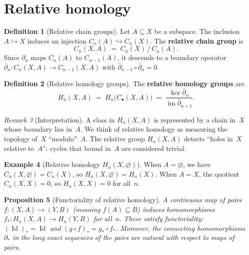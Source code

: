 \documentclass[12pt,a4paper,openany]{book}
\theoremstyle{definition}
\newtheorem{definition}{Definition}[chapter]
\newtheorem{example}[definition]{Example}
\theoremstyle{plain}
\newtheorem{proposition}[definition]{Proposition}
\theoremstyle{remark}
\newtheorem{remark}[definition]{Remark}
\DeclareMathOperator{\im}{im}
\DeclareMathOperator{\Id}{Id}
\begin{document}
\section{Relative homology}\label{sec:relative-homology}

\begin{definition}[Relative chain groups]\label{def:relative-chains}
Let $A\subseteq X$ be a subspace.  The inclusion $A\hookrightarrow X$
induces an injection $C_n(A)\hookrightarrow C_n(X)$.  The \textbf{relative
chain group} is
\[
  C_n(X,A) \;=\; C_n(X)\,/\,C_n(A).
\]
Since $\partial_n$ maps $C_n(A)$ to $C_{n-1}(A)$, it descends to a
boundary operator
$\bar\partial_n\colon C_n(X,A)\to C_{n-1}(X,A)$
with $\bar\partial_{n-1}\circ\bar\partial_n=0$.
\end{definition}

\begin{definition}[Relative homology groups]\label{def:relative-homology}
The \textbf{relative homology groups} are
\[
  H_n(X,A) \;=\; H_n\bigl(C_\bullet(X,A)\bigr)
  \;=\; \frac{\ker\bar\partial_n}{\im\bar\partial_{n+1}}.
\]
\end{definition}

\begin{remark}[Interpretation]\label{rem:relative-interpretation}
A class in $H_n(X,A)$ is represented by a chain in~$X$ whose boundary
lies in~$A$.  We think of relative homology as measuring the
topology of~$X$ ``modulo''~$A$.  The relative group $H_n(X,A)$ detects
``holes in~$X$ relative to~$A$'': cycles that bound in~$A$ are
considered trivial.
\end{remark}

\begin{example}[Relative homology $H_n(X,\varnothing)$]\label{ex:relative-empty}
When $A=\varnothing$, we have $C_n(X,\varnothing)=C_n(X)$, so
$H_n(X,\varnothing)=H_n(X)$.  When $A=X$, the quotient
$C_n(X,X)=0$, so $H_n(X,X)=0$ for all~$n$.
\end{example}

\begin{proposition}[Functoriality of relative homology]\label{prop:relative-functoriality}
A continuous map of pairs $f\colon(X,A)\to(Y,B)$ (meaning $f(A)\subseteq B$)
induces homomorphisms $f_*\colon H_n(X,A)\to H_n(Y,B)$ for all~$n$.
These satisfy functoriality: $(\Id)_*=\Id$ and $(g\circ f)_*=g_*\circ f_*$.
Moreover, the connecting homomorphisms $\partial_*$ in the long exact
sequences of the pairs are natural with respect to maps of pairs.
\end{proposition}
\end{document}
